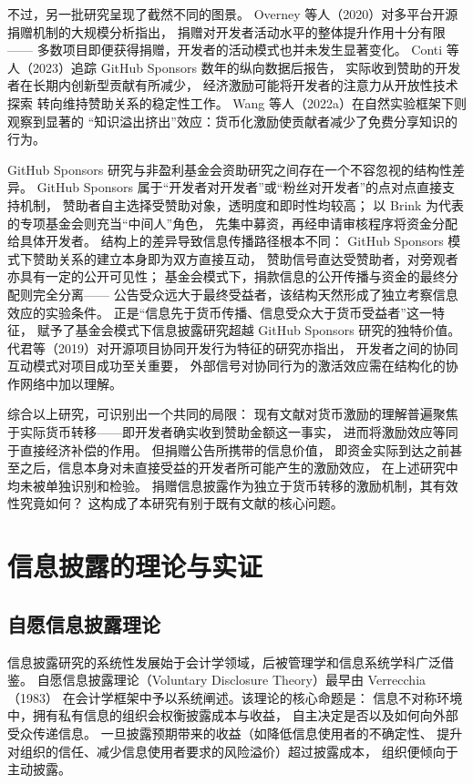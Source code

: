 不过，另一批研究呈现了截然不同的图景。
Overney 等人（2020）对多平台开源捐赠机制的大规模分析指出，
捐赠对开发者活动水平的整体提升作用十分有限——
多数项目即便获得捐赠，开发者的活动模式也并未发生显著变化\cite{overney2020not}。
Conti 等人（2023）追踪 GitHub Sponsors 数年的纵向数据后报告，
实际收到赞助的开发者在长期内创新型贡献有所减少，
经济激励可能将开发者的注意力从开放性技术探索
转向维持赞助关系的稳定性工作\cite{conti2023incentivizing}。
Wang 等人（2022a）在自然实验框架下则观察到显著的
“知识溢出挤出”效应：货币化激励使贡献者减少了免费分享知识的行为\cite{wang2022monetary}。

GitHub Sponsors 研究与非盈利基金会资助研究之间存在一个不容忽视的结构性差异。
GitHub Sponsors 属于“开发者对开发者”或“粉丝对开发者”的点对点直接支持机制，
赞助者自主选择受赞助对象，透明度和即时性均较高；
以 Brink 为代表的专项基金会则充当“中间人”角色，
先集中募资，再经申请审核程序将资金分配给具体开发者。
结构上的差异导致信息传播路径根本不同：
GitHub Sponsors 模式下赞助关系的建立本身即为双方直接互动，
赞助信号直达受赞助者，对旁观者亦具有一定的公开可见性；
基金会模式下，捐款信息的公开传播与资金的最终分配则完全分离——
公告受众远大于最终受益者，该结构天然形成了独立考察信息效应的实验条件。
正是“信息先于货币传播、信息受众大于货币受益者”这一特征，
赋予了基金会模式下信息披露研究超越 GitHub Sponsors 研究的独特价值。
代君等（2019）对开源项目协同开发行为特征的研究亦指出，
开发者之间的协同互动模式对项目成功至关重要，
外部信号对协同行为的激活效应需在结构化的协作网络中加以理解\cite{dai2019collaborative}。

综合以上研究，可识别出一个共同的局限：
现有文献对货币激励的理解普遍聚焦于实际货币转移——即开发者确实收到赞助金额这一事实，
进而将激励效应等同于直接经济补偿的作用。
但捐赠公告所携带的信息价值，
即资金实际到达之前甚至之后，信息本身对未直接受益的开发者所可能产生的激励效应，
在上述研究中均未被单独识别和检验。
捐赠信息披露作为独立于货币转移的激励机制，其有效性究竟如何？
这构成了本研究有别于既有文献的核心问题。

\section{信息披露的理论与实证}

\subsection{自愿信息披露理论}

信息披露研究的系统性发展始于会计学领域，后被管理学和信息系统学科广泛借鉴。
自愿信息披露理论（Voluntary Disclosure Theory）最早由 Verrecchia（1983）
在会计学框架中予以系统阐述\cite{verrecchia1983discretionary}。该理论的核心命题是：
信息不对称环境中，拥有私有信息的组织会权衡披露成本与收益，
自主决定是否以及如何向外部受众传递信息。
一旦披露预期带来的收益（如降低信息使用者的不确定性、
提升对组织的信任、减少信息使用者要求的风险溢价）超过披露成本，
组织便倾向于主动披露\cite{verrecchia1983discretionary}。

